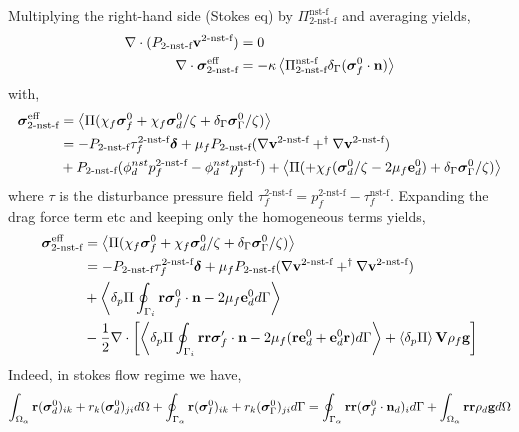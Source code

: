 Multiplying the right-hand side (Stokes eq) by  $\Pi_\text{2-nst-f}^\text{nst-f}$ and averaging yields, 
\begin{align}
    \div (P_\text{2-nst-f} \textbf{v}^\text{2-nst-f}) &= 0 \\
    \div \bm\sigma_\text{2-nst-f}^\text{eff}
    &= 
    - \kappa  \avg{\Pi_\text{2-nst-f}^\text{nst-f} \delta_\Gamma(\bm\sigma_f^0 \cdot \textbf{n})}
\end{align}
with, 
\begin{align}
    \bm\sigma_\text{2-nst-f}^\text{eff}
    &= 
    \avg{\Pi (\chi_f \bm\sigma_f^0
    + \chi_f \bm\sigma_d^0/\zeta
    + \delta_\Gamma \bm\sigma_\Gamma^0/\zeta
    )}\\
    &= 
    - P_\text{2-nst-f} \tau_f^\text{2-nst-f} \bm\delta
    +\mu_f P_\text{2-nst-f} (
        \grad \textbf{v}^\text{2-nst-f}
        + ^\dagger\grad \textbf{v}^\text{2-nst-f}
    )\\
    &+ P_\text{2-nst-f} (\phi_d^{nst} p_f^\text{2-nst-f} -\phi_d^{nst} p_f^\text{nst-f})
    + \avg{\Pi(+ \chi_f (\bm\sigma_d^0/\zeta - 2\mu_f \textbf{e}_d^0)
    + \delta_\Gamma \bm\sigma_\Gamma^0/\zeta)}
\end{align}
where $\tau$ is the disturbance pressure field $\tau^\text{2-nst-f}_f = p^\text{2-nst-f}_f - \tau^\text{nst-f}_f$.
Expanding the drag force term etc and keeping only the homogeneous terms yields,
\begin{align}
    \bm\sigma_\text{2-nst-f}^\text{eff}
    &= 
    \avg{\Pi (\chi_f \bm\sigma_f^0
    + \chi_f \bm\sigma_d^0/\zeta
    + \delta_\Gamma \bm\sigma_\Gamma^0/\zeta
    )}\\
    &= 
    - P_\text{2-nst-f} \tau_f^\text{2-nst-f} \bm\delta
    +\mu_f P_\text{2-nst-f} (
        \grad \textbf{v}^\text{2-nst-f}
        + ^\dagger\grad \textbf{v}^\text{2-nst-f}
    )\\
    &
    + \pavg{\Pi \intS[i]{\textbf{r}\bm\sigma_f^0\cdot \textbf{n} -2\mu_f \textbf{e}_d^0}}\\
    &-\frac{1}{2}\div  \left[
        \pavg{\Pi \intS[i]{\textbf{rr}\bm\sigma_f'\cdot \textbf{n} -2\mu_f (\textbf{r}\textbf{e}_d^0+\textbf{e}_d^0 \textbf{r})}}
        + \pavg{\Pi} \textbf{V} \rho_f \textbf{g}
    \right]
\end{align}
Indeed, in stokes flow regime we have, 
\begin{multline}
    \intO{ \textbf{r}(\bm{\sigma}^0_d)_{ik}+r_{k}(\bm{\sigma}^0_d)_{ji}}
    +\intS{ \textbf{r}(\bm{\sigma}^0_I)_{ik}+r_{k}(\bm{\sigma}_\Gamma^0)_{ji}}
    = 
    \intS{  \textbf{rr} (\bm{\sigma}_f^0\cdot\textbf{n}_d)_i }
    + \intO{ \textbf{rr}  \rho_d \textbf{g} } 
    \label{eq:dt_P2_alpha_bis}
\end{multline}



